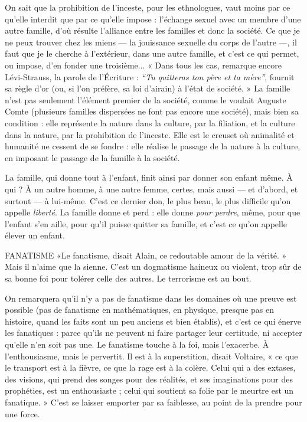 On sait que la prohibition de l'inceste, pour les ethnologues, vaut moins
par ce qu’elle interdit que par ce qu’elle impose : l'échange sexuel avec un
membre d’une autre famille, d’où résulte l'alliance entre les familles et donc la
société. Ce que je ne peux trouver chez les miens — la jouissance sexuelle du
corps de l’autre —, il faut que je le cherche à l'extérieur, dans une autre famille,
et c’est ce qui permet, ou impose, d’en fonder une troisième... « Dans tous les
cas, remarque encore Lévi-Strauss, la parole de l’Écriture : {\it “Tu quitteras ton père
et ta mère”}, fournit sa règle d’or (ou, si l’on préfère, sa loi d’airain) à l’état de
société. » La famille n’est pas seulement l’élément premier de la société, comme
le voulait Auguste Comte (plusieurs familles dispersées ne font pas encore une
société), mais bien sa condition : elle représente la nature dans la culture, par la
filiation, et la culture dans la nature, par la prohibition de l'inceste. Elle est le
creuset où animalité et humanité ne cessent de se fondre : elle réalise le passage
de la nature à la culture, en imposant le passage de la famille à la société.

La famille, qui donne tout à l’enfant, finit ainsi par donner son enfant
même. À qui ? À un autre homme, à une autre femme, certes, mais aussi — et
d’abord, et surtout — à lui-même. C’est ce dernier don, le plus beau, le plus difficile
qu’on appelle {\it liberté}. La famille donne et perd : elle donne {\it pour perdre},
même, pour que l'enfant s’en aille, pour qu’il puisse quitter sa famille, et c’est
ce qu’on appelle élever un enfant.

FANATISME «Le fanatisme, disait Alain, ce redoutable amour de la
vérité. » Mais il n’aime que la sienne. C’est un dogmatisme
haineux ou violent, trop sûr de sa bonne foi pour tolérer celle des autres. Le terrorisme
est au bout.

On remarquera qu’il n’y a pas de fanatisme dans les domaines où une
preuve est possible (pas de fanatisme en mathématiques, en physique, presque
pas en histoire, quand les faits sont un peu anciens et bien établis), et c’est ce
qui énerve les fanatiques : parce qu’ils ne peuvent ni faire partager leur certitude,
ni accepter qu’elle n’en soit pas une. Le fanatisme touche à la foi, mais
l’exacerbe. À l'enthousiasme, mais le pervertit. Il est à la superstition, disait
Voltaire, « ce que le transport est à la fièvre, ce que la rage est à la colère. Celui
qui a des extases, des visions, qui prend des songes pour des réalités, et ses imaginations
pour des prophéties, est un enthousiaste ; celui qui soutient sa folie
par le meurtre est un fanatique. » C’est se laisser emporter par sa faiblesse, au
point de la prendre pour une force.

